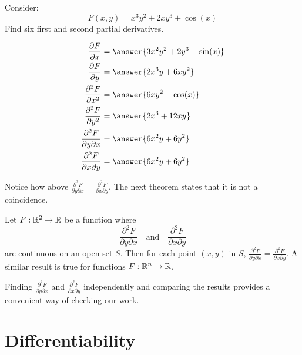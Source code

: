\documentclass{ximera}
\begin{document}
\begin{question}
  Consider:
  \[
  F(x,y) = x^3y^2 + 2xy^3+\cos(x)
  \]
  Find six first and second partial derivatives.
  \begin{prompt}
    \begin{align*}
      \pp[F]{x} &= \answer{3x^2y^2+2y^3-\sin(x)}\\
      \pp[F]{y} &= \answer{2x^3y+6xy^2}\\
      \frac{\partial^2F}{\partial x^2} &= \answer{6xy^2-\cos(x)}\\
      \frac{\partial^2F}{\partial y^2} &= \answer{2x^3+12xy}\\
      \frac{\partial^2F}{\partial y\partial x} &= \answer{6x^2y+6y^2}\\
      \frac{\partial^2F}{\partial x\partial y} &= \answer{6x^2y+6y^2}
    \end{align*}
  \end{prompt}
\end{question}
Notice how above $\frac{\partial^2F}{\partial y\partial
  x}=\frac{\partial^2F}{\partial x\partial y}$. The next theorem states
that it is not a coincidence.

\begin{theorem}
  Let $F:\mathbb R^2\to \mathbb R$ be a function where
  \[
  \frac{\partial^2F}{\partial y\partial x}\quad\text{and}\quad\frac{\partial^2F}{\partial x\partial y}
  \]
  are continuous on an open set $S$. Then for each point $(x,y)$ in
  $S$, $\frac{\partial^2F}{\partial y\partial
    x}=\frac{\partial^2F}{\partial x\partial y}$.
  A similar result is true for functions $F:\mathbb R^n\to \mathbb R$.
\end{theorem}

Finding $\frac{\partial^2F}{\partial y\partial x}$ and
$\frac{\partial^2F}{\partial x\partial y}$ independently and comparing
the results provides a convenient way of checking our work.

\section{Differentiability}
\end{document}
